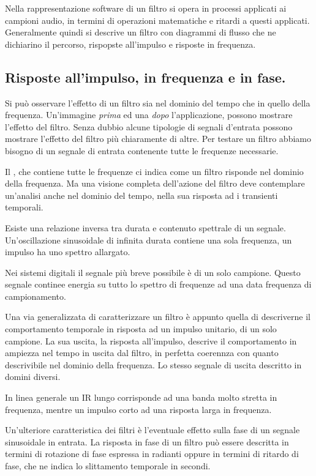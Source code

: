 Nella rappresentazione software di un filtro si opera in processi applicati
ai campioni audio, in termini di operazioni matematiche e ritardi a questi applicati.
Generalmente quindi si descrive un filtro con diagrammi di flusso che ne dichiarino
il percorso, rispopste all'impulso e risposte in frequenza.

\subsection{Risposte all'impulso, in frequenza e in fase.}

Si può osservare l'effetto di un filtro sia nel dominio del tempo che in quello
della frequenza. Un'immagine \emph{prima} ed una \emph{dopo} l'applicazione, possono
mostrare l'effetto del filtro. Senza dubbio alcune tipologie di segnali d'entrata
possono mostrare l'effetto del filtro più chiaramente di altre. Per testare un
filtro abbiamo bisogno di un segnale di entrata contenente tutte le frequenze necessarie.

Il \rb, che contiene tutte le frequenze ci indica come un filtro risponde nel dominio
della frequenza. Ma una visione completa dell'azione del filtro deve contemplare
un'analisi anche nel dominio del tempo, nella sua risposta ad i transienti temporali.

Esiste una relazione inversa tra durata e contenuto spettrale di un segnale.
Un'oscillazione sinusoidale di infinita durata contiene una sola frequenza, un
impulso ha uno spettro allargato.

Nei sistemi digitali il segnale più breve possibile è di un solo campione. Questo
segnale continee energia su tutto lo spettro di frequenze ad una data frequenza
di campionamento.

Una via generalizzata di caratterizzare un filtro è appunto quella di descriverne
il comportamento temporale in risposta ad un impulso unitario, di un solo campione.
La sua uscita, la risposta all'impulso, descrive il comportamento in ampiezza nel
tempo in uscita dal filtro, in perfetta coerennza con quanto descrivibile nel dominio
della frequenza. Lo stesso segnale di uscita descritto in domini diversi.

In linea generale un IR lungo corrisponde ad una banda molto stretta in frequenza,
mentre un impulso corto ad una risposta larga in frequenza.

Un'ulteriore caratteristica dei filtri è l'eventuale effetto sulla fase di un
segnale sinusoidale in entrata. La risposta in fase di un filtro può essere descritta
in termini di rotazione di fase espressa in radianti oppure in termini di ritardo
di fase, che ne indica lo slittamento temporale in secondi.


